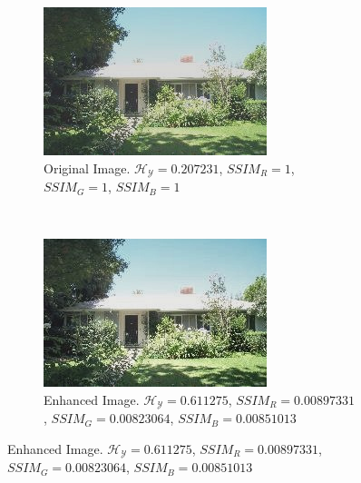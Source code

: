 \begin{figure}[H]
    \centering
    \begin{subfigure}[t]{width=45mm}
        \includegraphics[width=\textwidth]{./Figures/calhouse_0230.jpg}
        \caption{Original Image. $\mathscr{H_Y}=0.207231$, $SSIM_R=1$, $SSIM_G=1$, $SSIM_B=1$}
        \label{fig:casa1original}
    \end{subfigure}
    ~ %
    \begin{subfigure}[t]{0.45mm}
        \includegraphics[width=\textwidth]{./Figures/calhouse_0230_20-25165283474-10.jpg}
        \caption{Enhanced Image. $\mathscr{H_Y}=0.611275$, $SSIM_R=0.00897331$, $SSIM_G=0.00823064$, $SSIM_B=0.00851013$}

\end{subfigure}
\end{figure}
